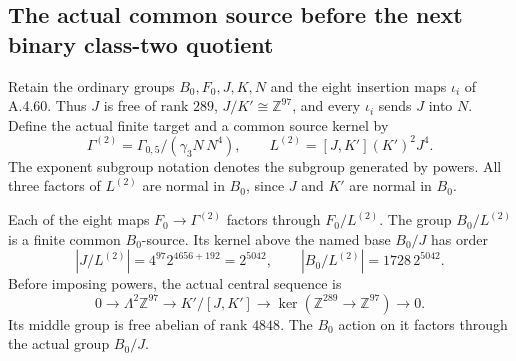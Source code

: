 \subsection{The actual common source before the next binary class-two quotient}

Retain the ordinary groups $B_0,F_0,J,K,N$ and the eight insertion
maps $\iota_i$ of A.4.60.  Thus $J$ is free of rank $289$,
$J/K'\cong\mathbb Z^{97}$, and every $\iota_i$ sends $J$ into
$N$.  Define the actual finite target and a common source kernel by
\[
 \Gamma^{(2)}=\Gamma_{0,5}/(\gamma_3N\,N^4),\qquad
 L^{(2)}=[J,K'](K')^2J^4.                              \tag{RCS.1}
\]
The exponent subgroup notation denotes the subgroup generated by
powers.  All three factors of $L^{(2)}$ are normal in $B_0$,
since $J$ and $K'$ are normal in $B_0$.

\begin{lemma}
Each of the eight maps $F_0\to\Gamma^{(2)}$ factors through
$F_0/L^{(2)}$.  The group $B_0/L^{(2)}$ is a finite common
$B_0$-source.  Its kernel above the named base $B_0/J$ has order
\[
 |J/L^{(2)}|=4^{97}2^{4656+192}=2^{5042},\qquad
 |B_0/L^{(2)}|=1728\,2^{5042}.                         \tag{RCS.2}
\]
Before imposing powers, the actual central sequence is
\[
 0\longrightarrow\Lambda^2\mathbb Z^{97}
 \longrightarrow K'/[J,K']
 \longrightarrow\ker(\mathbb Z^{289}\to\mathbb Z^{97})
 \longrightarrow0.                                   \tag{RCS.3}
\]
Its middle group is free abelian of rank $4848$.
The $B_0$ action on it factors through the actual group $B_0/J$.
\end{lemma}

